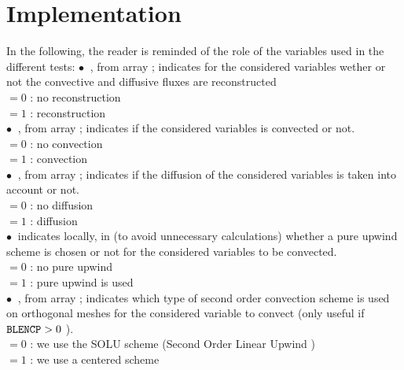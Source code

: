\section*{Implementation}

In the following, the reader is reminded of the role of the variables used in the different tests:
$\bullet \ $ , from array  ; indicates for the considered variables wether
or not the convective and diffusive fluxes are reconstructed \\
\hspace*{1cm}$ = 0$ : no reconstruction\\
\hspace*{1cm}$ = 1$ : reconstruction\\
$\bullet \ $ , from array  ; indicates if the considered variables is convected or not.\\
\hspace*{1cm}$ = 0$ : no convection\\
\hspace*{1cm}$ = 1$ : convection\\
$\bullet \ $ , from array  ; indicates if the diffusion of the considered variables is
taken into account or not.\\
\hspace*{1cm}$ = 0$ : no diffusion\\
\hspace*{1cm}$ = 1$ : diffusion\\
 $\bullet \ $  indicates locally, in  (to avoid unnecessary calculations) whether a pure upwind scheme is chosen  or not for the considered variables to be convected. \\
\hspace*{1cm}$ = 0$ : no pure upwind\\
\hspace*{1cm}$ = 1$ : pure upwind is used\\
$\bullet \ $ , from array  ; indicates which type of second order convection scheme is used on orthogonal meshes for the considered variable to convect  (only useful if $\text{\texttt{BLENCP}}>0\ $).\\
\hspace*{1cm}$ = 0$ : we use the  SOLU scheme (Second Order Linear
Upwind ) \\
\hspace*{1cm}$ = 1$ : we use a centered scheme\\
